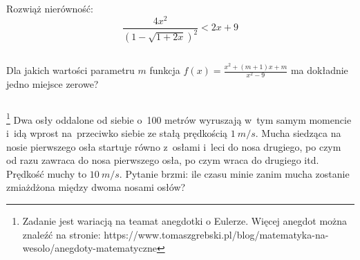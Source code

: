 








%

\begin{zada}
Rozwiąż nierówność:
\[\frac{4x^2}{(1-\sqrt{1+2x})^2} < 2x+9 \]
\end{zada}

$ $

\begin{zada} 
Dla jakich wartości parametru $m$ funkcja $f(x)=\frac{x^2+(m+1)x+m}{x^2-9}$ ma dokładnie jedno miejsce zerowe?
\end{zada}


$ $

\begin{zada}\footnote{Zadanie jest wariacją na teamat anegdotki o Eulerze. Więcej anegdot można znaleźć na stronie:  https://www.tomaszgrebski.pl/blog/matematyka-na-wesolo/anegdoty-matematyczne}
Dwa osły oddalone od siebie o~100 metrów wyruszają w~tym samym momencie i~idą wprost na~przeciwko siebie ze stałą prędkością $1~m/s.$ Mucha siedząca na nosie pierwszego osła startuje równo z~osłami i~leci do nosa drugiego, po czym od razu zawraca do nosa pierwszego osła, po czym wraca do drugiego itd. Prędkość muchy to $10~m/s.$ Pytanie brzmi: ile czasu minie zanim mucha zostanie zmiażdżona między dwoma nosami osłów?\\ 
\end{zada}

